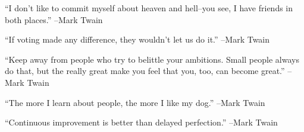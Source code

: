 \documentclass{article}%
\begin{document}
\linebreak%
\vspace{1mm}%
\begin{minipage}{\textwidth}%
\flushleft%
“I don't like to commit myself about heaven and hell–you see, I have friends in both places.”%
\linebreak%
\vspace{1mm}%
–Mark Twain%
\linebreak%
\vspace{1mm}%
\end{minipage}%
\linebreak%
\vspace{1mm}%
\begin{minipage}{\textwidth}%
\flushleft%
“If voting made any difference, they wouldn't let us do it.”%
\linebreak%
\vspace{1mm}%
–Mark Twain%
\linebreak%
\vspace{1mm}%
\end{minipage}%
\linebreak%
\vspace{1mm}%
\begin{minipage}{\textwidth}%
\flushleft%
“Keep away from people who try to belittle your ambitions. Small people always do that, but the really great make you feel that you, too, can become great.”%
\linebreak%
\vspace{1mm}%
–Mark Twain%
\linebreak%
\vspace{1mm}%
\end{minipage}%
\linebreak%
\vspace{1mm}%
\begin{minipage}{\textwidth}%
\flushleft%
“The more I learn about people, the more I like my dog.”%
\linebreak%
\vspace{1mm}%
–Mark Twain%
\linebreak%
\vspace{1mm}%
\end{minipage}%
\linebreak%
\vspace{1mm}%
\begin{minipage}{\textwidth}%
\flushleft%
“Continuous improvement is better than delayed perfection.”%
\linebreak%
\vspace{1mm}%
–Mark Twain%
\linebreak%
\vspace{1mm}%
\end{minipage}%
\end{document}
